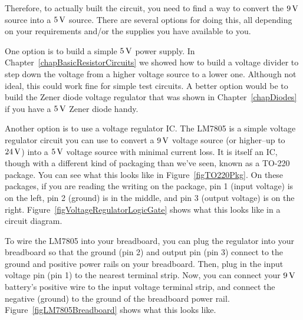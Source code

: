 Therefore, to actually built the circuit, you need to find a way to convert the $9\,\si{\volt}$ source into a $5\,\si{\volt}$ source.
There are several options for doing this, all depending on your requirements and/or the supplies you have available to you.

One option is to build a simple $5\,\si{\volt}$ power supply.
In Chapter~\ref{chapBasicResistorCircuits} we showed how to build a voltage divider to step down the voltage from a higher voltage source to a lower one.
Although not ideal, this could work fine for simple test circuits.
A better option would be to build the Zener diode voltage regulator that was shown in Chapter~\ref{chapDiodes} if you have a $5\,\si{\volt}$ Zener diode handy.


Another option is to use a voltage regulator IC.
The LM7805 is a simple voltage regulator circuit you can use to convert a $9\,\si{\volt}$ voltage source (or higher--up to $24\,\si{\volt}$) into a $5\,\si{\volt}$ voltage source with minimal current loss.
It is itself an IC, though with a different kind of packaging than we've seen, known as a TO-220 package.
You can see what this looks like in Figure~\ref{figTO220Pkg}.
On these packages, if you are reading the writing on the package, pin 1 (input voltage) is on the left, pin 2 (ground) is in the middle, and pin 3 (output voltage) is on the right.
Figure~\ref{figVoltageRegulatorLogicGate} shows what this looks like in a circuit diagram.


To wire the LM7805 into your breadboard, you can plug the regulator into your breadboard so that the ground (pin 2) and output pin (pin 3) connect to the ground and positive power rails on your breadboard.
Then, plug in the input voltage pin (pin 1) to the nearest terminal strip.
Now, you can connect your $9\,\si{\volt}$ battery's positive wire to the input voltage terminal strip, and connect the negative (ground) to the ground of the breadboard power rail.
Figure~\ref{figLM7805Breadboard} shows what this looks like.


